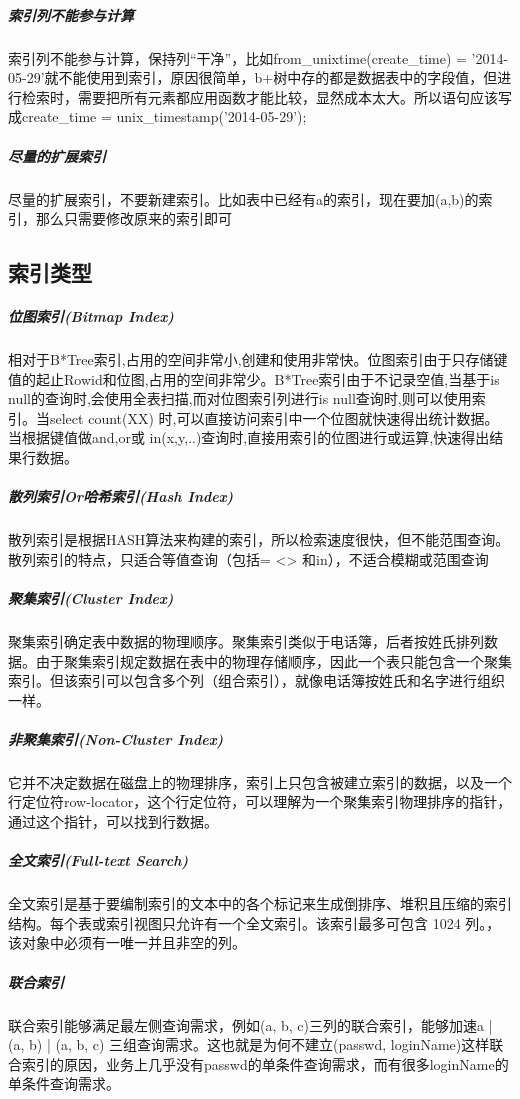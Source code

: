 \documentclass[letter]{book}
\begin{document}
\subparagraph{索引列不能参与计算}索引列不能参与计算，保持列“干净”，比如from\_unixtime(create\_time) = ’2014-05-29’就不能使用到索引，原因很简单，b+树中存的都是数据表中的字段值，但进行检索时，需要把所有元素都应用函数才能比较，显然成本太大。所以语句应该写成create\_time = unix\_timestamp(’2014-05-29’);

\subparagraph{尽量的扩展索引}尽量的扩展索引，不要新建索引。比如表中已经有a的索引，现在要加(a,b)的索引，那么只需要修改原来的索引即可

\subsection{索引类型}

\subparagraph{位图索引(Bitmap Index)}

相对于B*Tree索引,占用的空间非常小,创建和使用非常快。位图索引由于只存储键值的起止Rowid和位图,占用的空间非常少。B*Tree索引由于不记录空值,当基于is null的查询时,会使用全表扫描,而对位图索引列进行is null查询时,则可以使用索引。当select count(XX) 时,可以直接访问索引中一个位图就快速得出统计数据。当根据键值做and,or或 in(x,y,..)查询时,直接用索引的位图进行或运算,快速得出结果行数据。

\subparagraph{散列索引Or哈希索引(Hash Index)}

散列索引是根据HASH算法来构建的索引，所以检索速度很快，但不能范围查询。散列索引的特点，只适合等值查询（包括= <> 和in），不适合模糊或范围查询

\subparagraph{聚集索引(Cluster Index)}

聚集索引确定表中数据的物理顺序。聚集索引类似于电话簿，后者按姓氏排列数据。由于聚集索引规定数据在表中的物理存储顺序，因此一个表只能包含一个聚集索引。但该索引可以包含多个列（组合索引），就像电话簿按姓氏和名字进行组织一样。 

\subparagraph{非聚集索引(Non-Cluster Index)}

它并不决定数据在磁盘上的物理排序，索引上只包含被建立索引的数据，以及一个行定位符row-locator，这个行定位符，可以理解为一个聚集索引物理排序的指针，通过这个指针，可以找到行数据。

\subparagraph{全文索引(Full-text Search)}

全文索引是基于要编制索引的文本中的各个标记来生成倒排序、堆积且压缩的索引结构。每个表或索引视图只允许有一个全文索引。该索引最多可包含 1024 列。，该对象中必须有一唯一并且非空的列。 

\subparagraph{联合索引}

联合索引能够满足最左侧查询需求，例如(a, b, c)三列的联合索引，能够加速a | (a, b) | (a, b, c) 三组查询需求。这也就是为何不建立(passwd, loginName)这样联合索引的原因，业务上几乎没有passwd的单条件查询需求，而有很多loginName的单条件查询需求。
\end{document}
